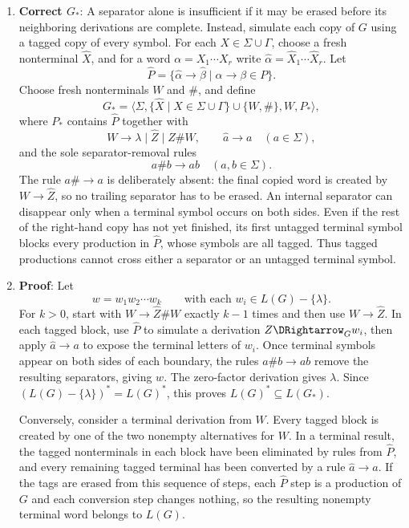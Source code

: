 \begin{enumerate}[{11.}1. ]
\begin{enumerate}
\item \textbf{Correct $G_*$}: A separator alone is insufficient if it may be
erased before its neighboring derivations are complete. Instead, simulate each
copy of $G$ using a tagged copy of every symbol. For each
$X\in\Sigma\cup\Gamma$, choose a fresh nonterminal $\widehat X$, and for a word
$\alpha=X_1\cdots X_r$ write
$\widehat\alpha=\widehat X_1\cdots\widehat X_r$. Let
\[
\widehat P=\{\widehat\alpha\to\widehat\beta\mid
\alpha\to\beta\in P\}.
\]
Choose fresh nonterminals $W$ and $\#$, and define
\[
G_*=\langle\Sigma,\{\widehat X\mid X\in\Sigma\cup\Gamma\}\cup\{W,\#\},W,P_*\rangle,
\]
where $P_*$ contains $\widehat P$ together with
\[
W\to\lambda\mid\widehat Z\mid\widehat Z\#W,\qquad
\widehat a\to a\quad(a\in\Sigma),
\]
and the sole separator-removal rules
\[
a\#b\to ab\quad(a,b\in\Sigma).
\]
The rule $a\#\to a$ is deliberately absent: the final copied word is created by
$W\to\widehat Z$, so no trailing separator has to be erased. An internal
separator can disappear only when a terminal symbol occurs on both sides. Even
if the rest of the right-hand copy has not yet finished, its first untagged
terminal symbol blocks every production in $\widehat P$, whose symbols are all
tagged. Thus tagged productions cannot cross either a separator or an untagged
terminal symbol.

\item \textbf{Proof}: Let
\[
w=w_1w_2\cdots w_k\qquad\text{with each }w_i\in L(G)-\{\lambda\}.
\]
For $k>0$, start with $W\to\widehat Z\#W$ exactly $k-1$ times and then use
$W\to\widehat Z$. In each tagged block, use $\widehat P$ to simulate a derivation
$Z\DRightarrow_G w_i$, then apply $\widehat a\to a$ to expose the terminal
letters of $w_i$. Once terminal symbols appear on both sides of each boundary,
the rules $a\#b\to ab$ remove the resulting separators, giving $w$. The
zero-factor derivation gives $\lambda$. Since
$(L(G)-\{\lambda\})^*=L(G)^*$, this proves $L(G)^*\subseteq L(G_*)$.

Conversely, consider a terminal derivation from $W$. Every tagged block is
created by one of the two nonempty alternatives for $W$. In a terminal result,
the tagged nonterminals in each block have been eliminated by rules from
$\widehat P$, and every remaining tagged terminal has been converted by a rule
$\widehat a\to a$. If the tags are erased from this sequence of steps, each
$\widehat P$ step is a production of $G$ and each conversion step changes
nothing, so the resulting nonempty terminal word belongs to $L(G)$.


\end{enumerate}
\end{enumerate}
